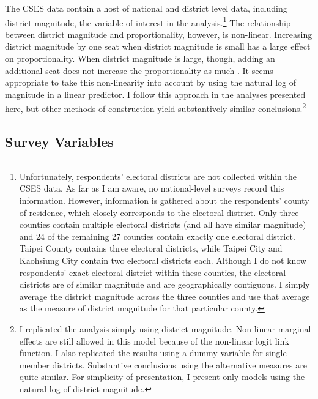 \documentclass[12pt]{article}
\begin{document}
The CSES data contain a host of national and district level data, including district magnitude, the variable of interest in the analysis.\footnote{Unfortunately, respondents' electoral districts are not collected within the CSES data. As far as I am aware, no national-level surveys record this information. However, information is gathered about the respondents' county of residence, which closely corresponds to the electoral district. Only three counties contain multiple electoral districts (and all have similar magnitude) and 24 of the remaining 27 counties contain exactly one electoral district. Taipei County contains three electoral districts, while Taipei City and Kaohsiung City contain two electoral districts each. Although I do not know respondents' exact electoral district within these counties, the electoral districts are of similar magnitude and are geographically contiguous. I simply average the district magnitude across the three counties and use that average as the measure of district magnitude for that particular county.} The relationship between district magnitude and proportionality, however, is non-linear. Increasing district magnitude by one seat when district magnitude is small has a large effect on proportionality. When district magnitude is large, though, adding an additional seat does not increase the proportionality as much \citep{GrofmanSelb2011}. It seems appropriate to take this non-linearity into account by using the natural log of magnitude in a linear predictor. I follow this approach in the analyses presented here, but other methods of construction yield substantively similar conclusions.\footnote{I replicated the analysis simply using district magnitude. Non-linear marginal effects are still allowed in this model because of the non-linear logit link function. I also replicated the results using a dummy variable for single-member districts. Substantive conclusions using the alternative measures are quite similar. For simplicity of presentation, I present only models using the natural log of district magnitude.}

\subsection*{Survey Variables}
\end{document}
